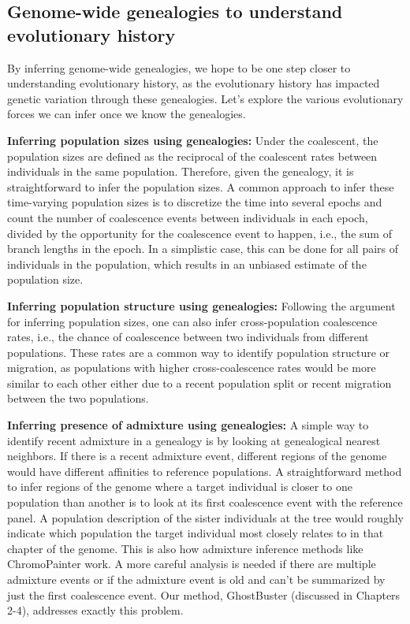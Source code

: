 \subsection{Genome-wide genealogies to understand evolutionary history}

By inferring genome-wide genealogies, we hope to be one step closer to understanding evolutionary history, as the evolutionary history has impacted genetic variation through these genealogies. Let's explore the various evolutionary forces we can infer once we know the genealogies.

\textbf{Inferring population sizes using genealogies:} Under the coalescent, the population sizes are defined as the reciprocal of the coalescent rates between individuals in the same population. Therefore, given the genealogy, it is straightforward to infer the population sizes. A common approach to infer these time-varying population sizes is to discretize the time into several epochs and count the number of coalescence events between individuals in each epoch, divided by the opportunity for the coalescence event to happen, i.e., the sum of branch lengths in the epoch. In a simplistic case, this can be done for all pairs of individuals in the population, which results in an unbiased estimate of the population size.

\textbf{Inferring population structure using genealogies:} Following the argument for inferring population sizes, one can also infer cross-population coalescence rates, i.e., the chance of coalescence between two individuals from different populations. These rates are a common way to identify population structure or migration, as populations with higher cross-coalescence rates would be more similar to each other either due to a recent population split or recent migration between the two populations.

\textbf{Inferring presence of admixture using genealogies:} A simple way to identify recent admixture in a genealogy is by looking at genealogical nearest neighbors. If there is a recent admixture event, different regions of the genome would have different affinities to reference populations. A straightforward method to infer regions of the genome where a target individual is closer to one population than another is to look at its first coalescence event with the reference panel. A population description of the sister individuals at the tree would roughly indicate which population the target individual most closely relates to in that chapter of the genome. This is also how admixture inference methods like ChromoPainter work. A more careful analysis is needed if there are multiple admixture events or if the admixture event is old and can't be summarized by just the first coalescence event. Our method, GhostBuster (discussed in Chapters 2-4), addresses exactly this problem.

